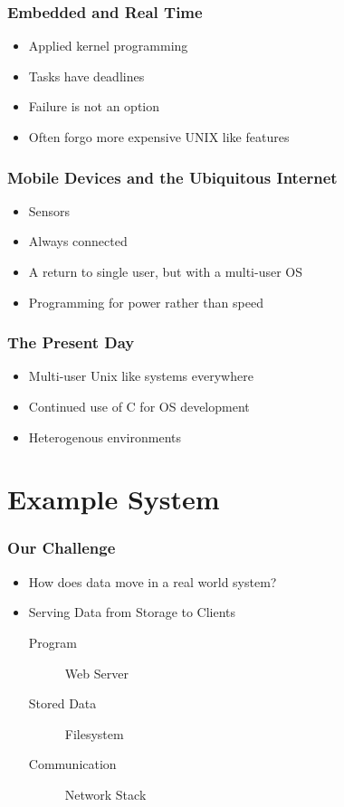 \documentclass[pdftex]{beamer} %
\begin{document}
\begin{frame}
  \frametitle{Embedded and Real Time}
  \begin{itemize}
  \item Applied kernel programming
  \item Tasks have deadlines
  \item Failure is not an option
  \item Often forgo more expensive UNIX like features
  \end{itemize}
\end{frame}

\begin{frame}
  \frametitle{Mobile Devices and the Ubiquitous Internet}
  \begin{itemize}
  \item Sensors
  \item Always connected
  \item A return to single user, but with a multi-user OS
  \item Programming for power rather than speed
  \end{itemize}
\end{frame}

\begin{frame}
  \frametitle{The Present Day}
  \begin{itemize}
  \item Multi-user Unix like systems everywhere
  \item Continued use of C for OS development
  \item Heterogenous environments
  \end{itemize}
\end{frame}

\section{Example System}
\label{sec:example-system}

\begin{frame}
  \frametitle{Our Challenge}
  \begin{itemize}
  \item How does data move in a real world system?
  \item Serving Data from Storage to Clients
    \begin{description}
    \item[Program] Web Server
    \item[Stored Data] Filesystem
    \item[Communication] Network Stack
    \end{description}
  \end{itemize}
\end{frame}
\end{document}
